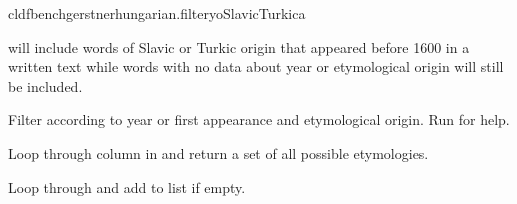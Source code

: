 \documentclass[letterpaper,10pt,english]{sphinxmanual}
\begin{document}
{{{{\begin{sphinxVerbatim}[commandchars=\\\{\}]
cldfbenchgerstnerhungarian.filter\PYGZhy{}y\PYGZhy{}oSlavicTurkic\PYGZhy{}a
\end{sphinxVerbatim}

\sphinxAtStartPar
will include words of Slavic or Turkic origin that appeared before 1600 in a
written text while words with no data about year or etymological origin
will still be included.

\label{\detokenize{filter:module-gerstnerhungariancommands.filter}}
\sphinxAtStartPar
Filter  according to year or first appearance and
etymological origin. Run 
for help.

\begin{fulllineitems}
\label{\detokenize{filter:gerstnerhungariancommands.filter.add_all_etymologies}}
\pysigstartsignatures
{}
\pysigstopsignatures
\sphinxAtStartPar
Loop through column  in  and return a set
of all possible etymologies.

\end{fulllineitems}


\begin{fulllineitems}
\label{\detokenize{filter:gerstnerhungariancommands.filter.find_empty}}
\pysigstartsignatures
{}
\pysigstopsignatures
\sphinxAtStartPar
Loop through  and add  to list if 
empty.


\end{fulllineitems}}}}}
\end{document}
